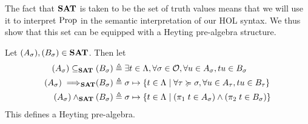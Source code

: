 \documentclass[a4paper,UKenglish,cleveref, autoref, thm-restate]{lipics-v2021}
\begin{document}
The fact that ${\mathbf{SAT}}$ is taken to be the set of truth values means that we will use it to interpret $\mathrm{Prop}$ in the semantic interpretation of our HOL syntax. We thus show that this set can be equipped with a Heyting pre-algebra structure.

\begin{proposition}
\label{prop:SAT}
  Let $(A_\sigma),(B_\sigma) \in {\mathbf{SAT}}$. Then let
  \begin{align*}
    (A_\sigma) \subseteq_{{\mathbf{SAT}}} (B_\sigma) &\triangleq \exists t \in \Lambda, \forall \sigma \in \mathcal O, \forall u \in A_{\sigma}, tu \in B_{\sigma}\\
    (A_\sigma) \implies\!\!\!_{{\mathbf{SAT}}} (B_\sigma) &\triangleq \sigma \mapsto \{ t \in \Lambda \mid \forall \tau \succcurlyeq \sigma, \forall u \in A_{\tau}, tu \in B_{\tau}\}\\
    (A_\sigma)\land_{{\mathbf{SAT}}}(B_\sigma) &\triangleq \sigma \mapsto \{ t \in \Lambda \mid (\pi_1\;t\in A_{\sigma}) \land (\pi_2\;t \in B_{\sigma})\}
  \end{align*}
  This defines a Heyting pre-algebra.
\end{proposition}
\end{document}
